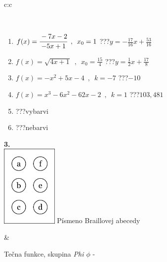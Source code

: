 \documentclass[10pt]{report}
\begin{document}
\begin{tabular}{c:c}
\begin{minipage}[c][104.5mm][t]{0.5\linewidth}
\begin{center}
\begin{minipage}{0.95\linewidth}
\begin{center}
\end{center}
\end{minipage}
\\[1mm]
\begin{minipage}{0.79\linewidth}
\begin{center}
\begin{varwidth}{\linewidth}
\begin{enumerate}
\small
\item $f(x)=\cfrac{-7x-2}{-5x+1}\enspace , \enspace x_0=1$\quad \dotfill\; ???\;\dotfill \quad $y = -\frac{17}{16}x+\frac{53}{16}$
\item $f(x)=\sqrt{4x+1}\enspace , \enspace x_0=\frac{15}{4}$\quad \dotfill\; ???\;\dotfill \quad $y = \frac{1}{2}x+\frac{17}{8}$
\item $f(x)=-x^2+5x-4\enspace , \enspace k=-7$\quad \dotfill\; ???\;\dotfill \quad $-10$
\item $f(x)=x^3-6x^2-62x-2\enspace , \enspace k=1$\quad \dotfill\; ???\;\dotfill \quad $103 , 481$
\item \quad \dotfill\; ???\;\dotfill \quad vybarvi
\item \quad \dotfill\; ???\;\dotfill \quad nebarvi
\end{enumerate}
\end{varwidth}
\end{center}
\end{minipage}
\begin{minipage}{0.20\linewidth}
\begin{center}
{\Huge\bfseries 3.} \\[2mm]
\includegraphics[height=40mm]{../images/braille.png}
{\small Písmeno Braillovej abecedy}
\end{center}
\end{minipage}
\end{center}
\end{minipage}
&
\begin{minipage}[c][104.5mm][t]{0.5\linewidth}
\begin{center}
\vspace{7mm}
{\huge Tečna funkce, skupina \textit{Phi $\phi$} -}\\[5mm]

\end{center}
\end{minipage}
\end{tabular}
\end{document}
